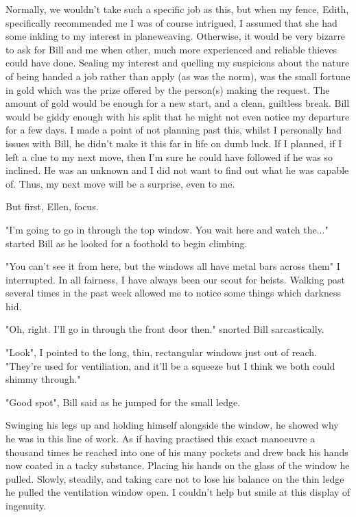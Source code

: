 Normally, we wouldn't take such a specific job as this, but when my fence,
Edith, specifically recommended me I was of course intrigued, I assumed that she
had some inkling to my interest in planeweaving. Otherwise, it would be very
bizarre to ask for Bill and me when other, much more experienced and reliable
thieves could have done. Sealing my
interest and quelling my suspicions about the nature of being handed a job
rather than apply (as was the norm), was the small fortune in gold which was the
prize offered by the person(s) making the request. The amount of gold would be enough for a new
start, and a clean, guiltless break. Bill would be giddy enough with his split
that he might not even notice my departure for a few days. I made a point of not
planning past this, whilst I personally had issues with Bill, he didn't make it
this far in life on dumb luck. If I planned, if I left a clue to my next move,
then I'm sure he could have followed if he was so inclined. He was an unknown
and I did not want to find out what he was capable of. Thus, my next move will
be a surprise, even to me. 

But first, Ellen, focus. 

\begin{dialogue}
    \item{"I'm going to go in through the top window. You wait here and watch
    the..." started Bill as he looked for a foothold to begin climbing.}
    \item {"You can't see it from here, but the windows all have metal bars
    across them" I interrupted.
    In all fairness, I have always been our scout for heists. Walking past
    several times in the past week allowed me to notice some things which
    darkness hid.}
    \item{"Oh, right. I'll go in through the front door then." snorted Bill sarcastically.}
    \item{"Look", I pointed to the long, thin, rectangular windows just out of
    reach.
     "They're used for ventiliation, and it'll be a squeeze but I think we both could shimmy through."}
    \item{"Good spot", Bill said as he jumped for the small ledge.}
\end{dialogue}

Swinging his legs up and holding himself alongside the window, he showed why he
was in this line of work. As if having practised this exact manoeuvre a thousand
times he reached into one of his many pockets and drew back his hands now coated
in a tacky substance. Placing his hands on the glass of the window he pulled.
Slowly, steadily, and taking care not to lose his balance on the thin ledge he
pulled the ventilation window open. I couldn't help but smile at this display
of ingenuity. 

